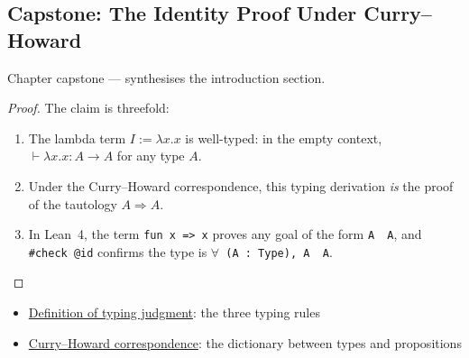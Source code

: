 
\subsection*{Capstone: The Identity Proof Under Curry--Howard}
\label{prf:capstone-lambda-calculus}

\begin{remark*}[Return]
Chapter capstone --- synthesises the introduction section.
\end{remark*}

\begin{proof}
The claim is threefold:
\begin{enumerate}
  \item The lambda term $I := \lambda x.x$ is well-typed: in the
        empty context, $\vdash \lambda x.x : A \to A$ for any type $A$.
  \item Under the Curry--Howard correspondence, this typing derivation
        \emph{is} the proof of the tautology $A \Rightarrow A$.
  \item In Lean~4, the term \texttt{fun x => x} proves any goal
        of the form \texttt{A \to\ A}, and \texttt{\#check @id} confirms
        the type is \texttt{$\forall$ (A : Type), A \to\ A}.
\end{enumerate}

%
%
%
\end{proof}

\begin{remark*}

\end{remark*}

\begin{remark*}[Dependencies]
\begin{itemize}
  \item \hyperref[def:typing-judgment]{Definition of typing judgment}:
        the three typing rules
  \item \hyperref[thm:curry-howard]{Curry--Howard correspondence}:
        the dictionary between types and propositions
\end{itemize}

\end{remark*}
